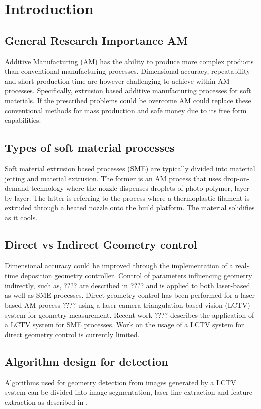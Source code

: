 \section*{Introduction}

\subsection*{General Research Importance AM}
Additive Manufacturing (AM) has the ability to produce more complex products than conventional manufacturing processes. Dimensional accuracy, repeatability and short production time are however challenging to achieve within AM processes. Specifically, extrusion based additive manufacturing processes for soft materials. If the prescribed problems could be overcome AM could replace these conventional methods for mass production and safe money due to its free form capabilities. 

\subsection*{Types of soft material processes}
Soft material extrusion based processes (SME) are typically divided into material jetting and material extrusion. The former is an AM process that uses drop-on-demand technology where the nozzle dispenses droplets of photo-polymer, layer by layer. The latter is referring to the process where a thermoplastic filament is extruded through a heated nozzle onto the build platform. The material solidifies as it cools.

\subsection*{Direct vs Indirect Geometry control}
Dimensional accuracy could be improved through the implementation of a real-time deposition geometry controller. Control of parameters influencing geometry indirectly, such as, ???? are described in ???? and is applied to both laser-based as well as SME processes. Direct geometry control has been performed for a laser-based AM process ???? using a laser-camera triangulation based vision (LCTV) system for geometry measurement. Recent work ???? describes the application of a LCTV system for SME processes. Work on the usage of a LCTV system for direct geometry control is currently limited. 

\subsection*{Algorithm design for detection}
Algorithms used for geometry detection from images generated by a LCTV system can be divided into image segmentation, laser line extraction and feature extraction as described in \cite{li2007recent}.

